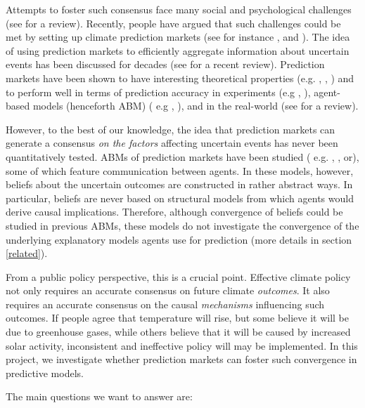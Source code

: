 \documentclass{sig-alternate}
\begin{document}
	Attempts to foster such consensus face many \linebreak  social and psychological challenges (see \cite[Sections II.B to II.D]{Vandenbergh2013f} for a review). Recently, people have argued that such challenges could be met by setting up climate prediction markets (see for instance \cite{Hsu2011}, and \cite{Vandenbergh2013f}). The idea of using prediction markets to efficiently aggregate information about uncertain events has been discussed for decades (see \cite{Horn2014c} for a recent review). Prediction markets have been shown to have interesting theoretical properties (e.g. \cite{Set1998}, \cite{Hanson2012}, ) and to perform well in terms of prediction accuracy in experiments (e.g \cite{Hanson2006}, \cite{Healy2010}), agent-based models (henceforth ABM) ( e.g \cite{Klingert2012c}, \cite{Jumadinova2011a}), and in the real-world (see \cite{Wolfers2006} for a review).
	
However, to the best of our knowledge, the idea that prediction markets can generate a consensus \emph{on the factors} affecting  uncertain events has never been quantitatively tested. ABMs of prediction markets have been studied ( e.g. \cite{Klingert2012c}, \cite{Tseng2010a}, or\cite{Jumadinova2011a}), some of which feature communication between agents. In these models, however, beliefs about the uncertain outcomes are constructed in rather abstract ways. In particular, beliefs are never based on structural models from which agents would derive causal implications. Therefore, although convergence of beliefs could be studied in previous ABMs, these models do not investigate the convergence of the underlying explanatory models agents use for prediction (more details in section \ref{related}).

From a public policy perspective, this is a crucial point. Effective climate policy not only requires an accurate consensus on future climate \emph{outcomes}. It also requires an accurate consensus on the causal \emph{mechanisms}  influencing such outcomes. If people agree that temperature will rise, but some believe it will be due to greenhouse gases, while others believe that it will be caused by increased solar activity, inconsistent and ineffective policy will may be implemented. In this project, we investigate whether prediction markets can foster such convergence in predictive models.

The main questions we want to answer are:
\end{document}
